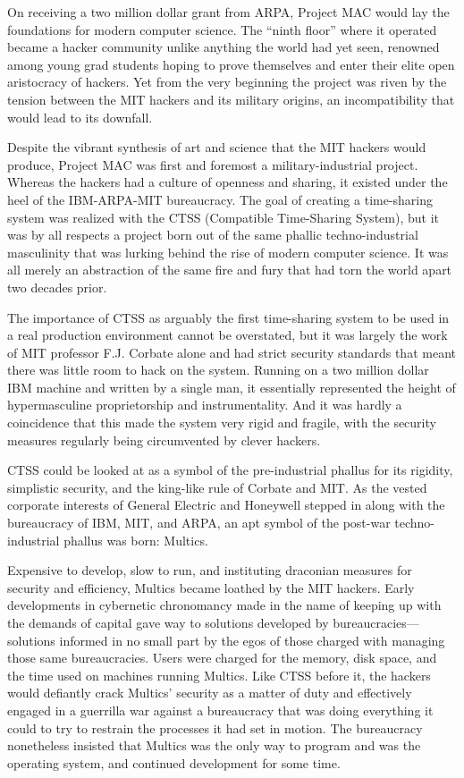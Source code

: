 \documentclass[10pt, statementpaper, twoside, openright]{memoir}
\begin{document}
On receiving a two million dollar grant from ARPA, Project MAC would lay the foundations for modern computer science. The ``ninth floor'' where it operated became a hacker community unlike anything the world had yet seen, renowned among young grad students hoping to prove themselves and enter their elite open aristocracy of hackers. Yet from the very beginning the project was riven by the tension between the MIT hackers and its military origins, an incompatibility that would lead to its downfall.

Despite the vibrant synthesis of art and science that the MIT hackers would produce, Project MAC was first and foremost a military-industrial project. Whereas the hackers had a culture of openness and sharing, it existed under the heel of the IBM-ARPA-MIT bureaucracy. The goal of creating a time-sharing system was realized with the CTSS (Compatible Time-Sharing System), but it was by all respects a project born out of the same phallic techno-industrial masculinity that was lurking behind the rise of modern computer science. It was all merely an abstraction of the same fire and fury that had torn the world apart two decades prior.

The importance of CTSS as arguably the first time-sharing system to be used in a real production environment cannot be overstated, but it was largely the work of MIT professor F.J. Corbate alone and had strict security standards that meant there was little room to hack on the system. Running on a two million dollar IBM machine and written by a single man, it essentially represented the height of hypermasculine proprietorship and instrumentality. And it was hardly a coincidence that this made the system very rigid and fragile, with the security measures regularly being circumvented by clever hackers.

CTSS could be looked at as a symbol of the pre-industrial phallus for its rigidity, simplistic security, and the king-like rule of Corbate and MIT. As the vested corporate interests of General Electric and Honeywell stepped in along with the bureaucracy of IBM, MIT, and ARPA, an apt symbol of the post-war techno-industrial phallus was born: Multics.

Expensive to develop, slow to run, and instituting draconian measures for security and efficiency, Multics became loathed by the MIT hackers. Early developments in cybernetic chronomancy made in the name of keeping up with the demands of capital gave way to solutions developed by bureaucracies---solutions informed in no small part by the egos of those charged with managing those same bureaucracies. Users were charged for the memory, disk space, and the time used on machines running Multics. Like CTSS before it, the hackers would defiantly crack Multics' security as a matter of duty and effectively engaged in a guerrilla war against a bureaucracy that was doing everything it could to try to restrain the processes it had set in motion. The bureaucracy nonetheless insisted that Multics was the only way to program and was the operating system, and continued development for some time.
\end{document}
